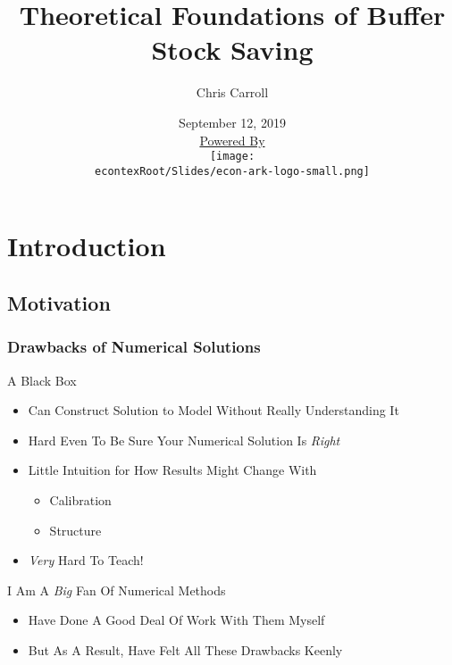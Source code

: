\documentclass[pdflatex]{beamer}\providecommand{\texname}{BufferStockTheory-Slides}%
\title[Buffer Stock Theory]{Theoretical Foundations of Buffer Stock Saving}
\author[Carroll]{Chris Carroll}
\institute[JHU]{Johns Hopkins University}
\date[\today]{September 12, 2019  \\ \medskip \medskip \medskip \href{https://econ-ark.org/}{\small Powered By} \\ \texttt{[image: \\econtexRoot/Slides/econ-ark-logo-small.png]}}
\begin{document}


\begin{frame}[plain]
  \titlepage
\end{frame}


\section{Introduction}
\subsection{Motivation}

\begin{frame}
\frametitle{Drawbacks of Numerical Solutions}


\pause A Black Box \pause
\begin{itemize}
\item Can Construct Solution to Model Without Really Understanding It
\item Hard Even To Be Sure Your Numerical Solution Is {\it Right}
\item Little Intuition for How Results Might Change With
\begin{itemize}
\item Calibration
\item Structure
\end{itemize}
\item {\it Very} Hard To Teach!
\end{itemize}

\medskip\medskip
\pause I Am A {\it Big} Fan Of Numerical Methods
\begin{itemize}
\item Have Done A Good Deal Of Work With Them Myself
\item But As A Result, Have Felt All These Drawbacks Keenly
\end{itemize}



\end{frame}
\end{document}

